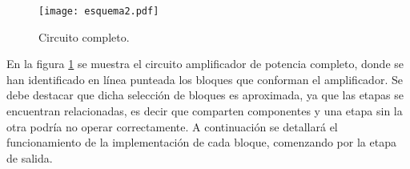 \begin{figure}
	\texttt{[image: esquema2.pdf]}
	\caption{Circuito completo.}
	\label{fig.cto_completo}
\end{figure}

En la figura \ref{fig.cto_completo} se muestra el circuito amplificador de potencia completo, donde se han identificado en línea punteada los bloques que conforman el amplificador. Se debe destacar que dicha selección de bloques es aproximada, ya que las etapas se encuentran relacionadas, es decir que comparten componentes y una etapa sin la otra podría no operar correctamente. A continuación se detallará el funcionamiento de la implementación de cada bloque, comenzando por la etapa de salida.
